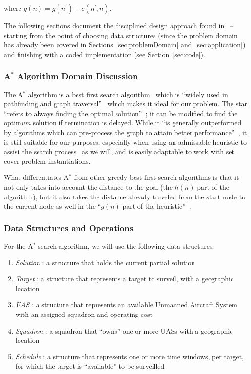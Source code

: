 \documentclass[conference]{IEEEtran}
\begin{document}
\noindent where $g(n) = g(n^\prime) + c(n^\prime,n)$.

The following sections document the disciplined design approach found
in~\cite{lamontSCP, lamontDesign, lamontMIS} -- starting from the point of
choosing data structures (since the problem domain has already been covered in
Sections~\ref{sec:problemDomain} and~\ref{sec:application}) and finishing with
a coded implementation (see Section~\ref{sec:code}).

\subsubsection{A$^*$ Algorithm Domain Discussion}

The A$^*$ algorithm is a best first search algorithm~\cite{lamontBFS,
pearl1984} which is ``widely used in pathfinding and graph
traversal''~\cite{wiki:astar} which makes it ideal for our problem. The star
``refers to always finding the optimal solution''~\cite{lamontBFS}; it can be
modified to find the optim\emph{um} solution if termination is delayed. While
it ``is generally outperformed by algorithms which can pre-process the graph to
attain better performance''~\cite{wiki:astar}, it is still suitable for our
purposes, especially when using an admissable heuristic to assist the search
process~\cite{pearl1984} as we will, and is easily adaptable to work with set
cover problem instantiations. 

What differentiates A$^*$ from other greedy best first search algorithms is
that it not only takes into account the distance to the goal (the $h(n)$
part of the algorithm), but it also takes the distance already
traveled from the start node to the current node as well in the ``$g(n)$ part of
the heuristic''~\cite{lamontBFS}.

\subsubsection{Data Structures and Operations} \label{sec:dataStructures}

For the A$^*$ search algorithm, we will use the following data structures:

\begin{enumerate}
  \item[] \emph{Solution} : a structure that holds the current partial solution
  \item[] \emph{Target} : a structure that represents a target to surveil, with
    a geographic location
  \item[] \emph{UAS} : a structure that represents an available Unmanned
    Aircraft System with an assigned squadron and operating cost
  \item[] \emph{Squadron} : a squadron that ``owns'' one or more UASs with a
    geographic location
  \item[] \emph{Schedule} : a structure that represents one or more time
    windows, per target, for which the target is ``available'' to be surveilled
\end{enumerate}
\end{document}
